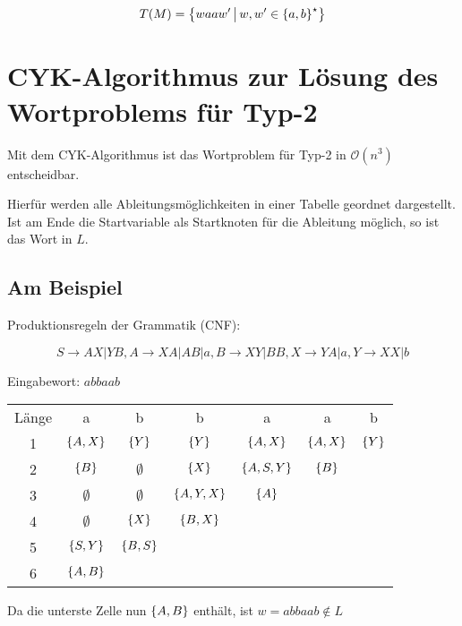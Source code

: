 \begin{equation*}
	T(M)=\left\{ waaw' \,\middle|\, w,w'\in\left\{ a,b \right\}^\star \right\}
\end{equation*}


\section{CYK-Algorithmus zur Lösung des Wortproblems für Typ-2}\label{algo:cyk}
Mit dem CYK-Algorithmus ist das Wortproblem für Typ-2 in $\mathcal O(n^3)$ entscheidbar.

Hierfür werden alle Ableitungsmöglichkeiten in einer Tabelle geordnet dargestellt. Ist am Ende die Startvariable als Startknoten für die Ableitung möglich, so ist das Wort in $L$.


\subsection*{Am Beispiel}
Produktionsregeln der Grammatik (CNF):

\begin{equation*}
	S\rightarrow AX|YB, A\rightarrow XA|AB|a, B\rightarrow XY|BB, X\rightarrow YA|a, Y\rightarrow XX|b
\end{equation*}

Eingabewort: $abbaab$

\renewcommand{\arraystretch}{1.2}
\begin{tabular}{ccccccc}
	Länge & a & b & b & a & a & b\\
	\cline{2-7}
	1 & \multicolumn{1}{|c|}{$\left\{ A,X \right\}$} & \multicolumn{1}{c|}{$\left\{ Y \right\}$} & \multicolumn{1}{c|}{$\left\{ Y \right\}$} & \multicolumn{1}{c|}{$\left\{ A,X \right\}$} & \multicolumn{1}{c|}{$\left\{ A,X \right\}$} & \multicolumn{1}{c|}{$\left\{ Y \right\}$}\\
	\cline{2-7}
	2 & \multicolumn{1}{|c|}{$\left\{ B \right\}$} & \multicolumn{1}{c|}{$\emptyset$} & \multicolumn{1}{c|}{$\left\{ X \right\}$} & \multicolumn{1}{c|}{$\left\{ A,S,Y \right\}$} & \multicolumn{1}{c|}{$\left\{ B \right\}$} &\\
	\cline{2-6}
	3 & \multicolumn{1}{|c|}{$\emptyset$} & \multicolumn{1}{c|}{$\emptyset$} & \multicolumn{1}{c|}{$\left\{ A,Y,X \right\}$} & \multicolumn{1}{c|}{$\left\{ A \right\}$} &&\\
	\cline{2-5}
	4 & \multicolumn{1}{|c|}{$\emptyset$} & \multicolumn{1}{c|}{$\left\{ X \right\}$} & \multicolumn{1}{c|}{$\left\{ B,X \right\}$} &&&\\
	\cline{2-4}
	5 & \multicolumn{1}{|c|}{$\left\{ S,Y \right\}$} & \multicolumn{1}{c|}{$\left\{ B,S \right\}$} &&&&\\
	\cline{2-3}
	6 & \multicolumn{1}{|c|}{$\left\{ A,B \right\}$} &&&&&\\
	\cline{2-2}
\end{tabular}

Da die unterste Zelle nun $\left\{ A,B \right\}$ enthält, ist $w=abbaab\not\in L$
